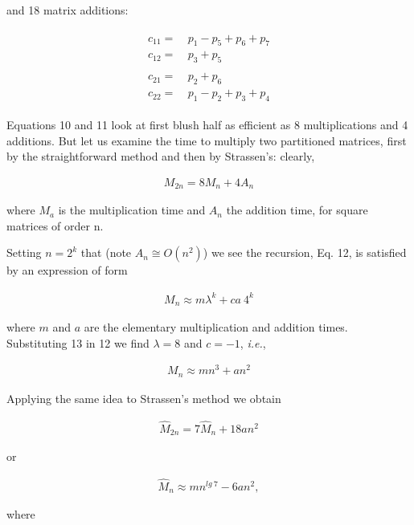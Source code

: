 and 18 matrix additions:

\begin{align}
\begin{split}
    c_{11} =&\ p_{1} - p_{5} + p_{6} + p_{7}    \\
    c_{12} =&\ p_{3} + p_{5}                    \\
                                                \\
    c_{21} =&\ p_{2} + p_{6}                    \\
    c_{22} =&\ p_{1} - p_{2} + p_{3} + p_{4}
\end{split}
\end{align}

Equations 10 and 11 look at first blush half as efficient as 8 multiplications and 4 additions. But let us examine the time to multiply two partitioned matrices, first by the straightforward method and then by Strassen's: clearly,

\begin{align}
    M_{2n} = 8M_{n} + 4A_{n}
\end{align}

where $M_{a}$ is the multiplication time and $A_{n}$ the addition time, for square matrices of order n.

Setting $n = 2^{k}$ that (note $A_{n} \cong O(n^{2})$) we see the recursion, Eq. 12, is satisfied by an expression of form

\begin{align}
    M_{n} \approx m\lambda^{k} + ca\ 4^{k}
\end{align}

where $m$ and $a$ are the elementary multiplication and addition times. Substituting 13 in 12 we find $\lambda = 8$ and $c = -1$, \textit{i.e.},

\begin{align}
    M_{n} \approx mn^{3} + an^{2}
\end{align}

Applying the same idea to Strassen’s method we obtain

\begin{align}
    \widehat{M}_{2n} = 7\widehat{M}_{n} + 18an^{2}
\end{align}

or

\begin{align}
    \widehat{M}_{n} \approx mn^{lg\ 7} - 6an^{2} ,
\end{align}

where

